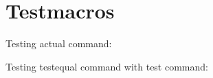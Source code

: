 \section*{Testmacros}
\makeatletter
\indent Testing actual command: \\

Testing testequal command with test command:\\
\noindent{}
\noindent{}
\makeatother